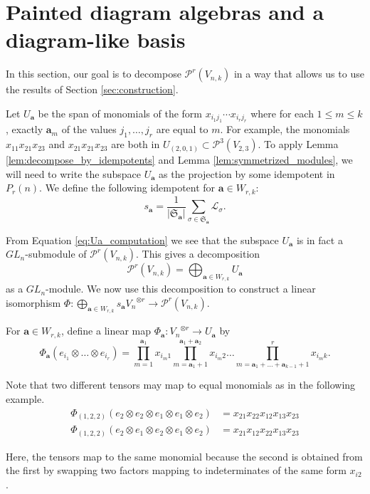 \documentclass[ALCO,Unicode,published]{cedram}
\newcommand{\LL}{\mathcal{L}}
\newcommand{\PP}{\mathcal{P}}
\newcommand{\SG}{\mathfrak{S}}
\newcommand{\bfa}{{\boldsymbol{a}}}
\newcommand{\abs}[1]{\left| #1\right |}
\begin{document}
\section{Painted diagram algebras and a diagram-like basis}\label{sec:diagram_like_basis}

In this section, our goal is to decompose $\PP^r(V_{n,k})$ in a way that allows us to use the results of Section \ref{sec:construction}.

Let $U_\bfa$ be the span of monomials of the form $x_{i_1j_1}\cdots x_{i_rj_r}$ where for each $1\leq m\leq k$, exactly $\bfa_m$ of the values $j_1,\dots,j_r$ are equal to $m$. For example, the monomials $x_{11}x_{21}x_{23}$ and $x_{21}x_{21}x_{23}$ are both in $U_{(2,0,1)}\subset \PP^3(V_{2,3})$.  To apply Lemma \ref{lem:decompose_by_idempotents} and Lemma \ref{lem:symmetrized_modules}, we will need to write the subspace $U_\bfa$ as the projection by some idempotent in $P_r(n)$. We define the following idempotent for $\bfa\in W_{r,k}$: \[s_\bfa=\frac{1}{\abs{\SG_\bfa}}\sum_{\sigma\in\SG_\bfa}\LL_\sigma.\]

From Equation \ref{eq:Ua_computation} we see that the subspace $U_\bfa$ is in fact a $GL_n$-submodule of $\PP^r(V_{n,k})$. This gives a decomposition \[\PP^r(V_{n,k})=\bigoplus_{\bfa\in W_{r,k}}U_\bfa\] as a $GL_n$-module. We now use this decomposition to construct a linear isomorphism $\Phi:\bigoplus_{\bfa\in W_{r,k}}s_\bfa {V_n}^{\otimes r}\to \PP^r(V_{n,k})$.

For $\bfa\in W_{r,k}$, define a linear map $\Phi_\bfa:{V_n}^{\otimes r}\to U_\bfa$ by \[\Phi_\bfa(e_{i_1}\otimes\dots\otimes e_{i_r})=\prod_{m=1}^{\bfa_1}x_{i_m1}\prod_{m=\bfa_1+1}^{\bfa_1+\bfa_2}x_{i_m2}\dots \prod_{m=\bfa_1+\dots+\bfa_{k-1}+1}^{r}x_{i_mk}.\]

\begin{exam} Note that two different tensors may map to equal monomials as in the following example.
    \begin{align*}
        \Phi_{(1,2,2)}(e_2\otimes e_2\otimes e_1\otimes e_1\otimes e_2)&=x_{21}x_{22}x_{12}x_{13}x_{23}\\
        \Phi_{(1,2,2)}(e_2\otimes e_1\otimes e_2\otimes e_1\otimes e_2)&=x_{21}x_{12}x_{22}x_{13}x_{23}
    \end{align*}

    Here, the tensors map to the same monomial because the second is obtained from the first by swapping two factors mapping to indeterminates of the same form $x_{i2}$.
\end{exam}
\end{document}
